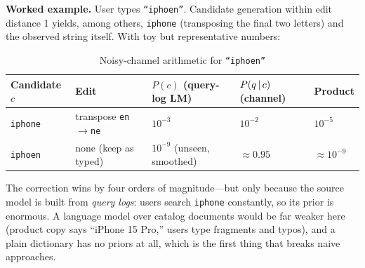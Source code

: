 \textbf{Worked example.} User types \texttt{``iphoen''}. Candidate generation within edit distance 1 yields, among others, \texttt{iphone} (transposing the final two letters) and the observed string itself. With toy but representative numbers:

\begin{table}[H]
\centering
\small
\caption{Noisy-channel arithmetic for \texttt{``iphoen''}}
\label{sr:tab:spell_example}
\begin{tabular}{lllll}
\toprule
\textbf{Candidate $c$} & \textbf{Edit} & \textbf{$P(c)$ (query-log LM)} & \textbf{$P(q \,|\, c)$ (channel)} & \textbf{Product} \\
\midrule
\texttt{iphone} & transpose \texttt{en}$\to$\texttt{ne} & $10^{-3}$ & $10^{-2}$ & $10^{-5}$ \\
\texttt{iphoen} & none (keep as typed) & $10^{-9}$ (unseen, smoothed) & $\approx 0.95$ & $\approx 10^{-9}$ \\
\bottomrule
\end{tabular}
\end{table}

The correction wins by four orders of magnitude---but only because the source model is built from \textit{query logs}: users search \texttt{iphone} constantly, so its prior is enormous. A language model over catalog documents would be far weaker here (product copy says ``iPhone 15 Pro,'' users type fragments and typos), and a plain dictionary has no priors at all, which is the first thing that breaks naive approaches.

